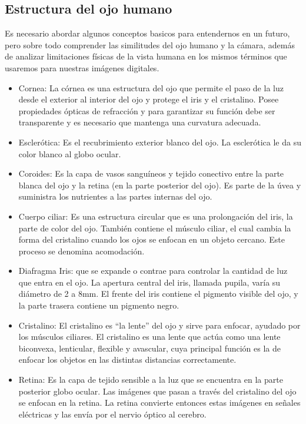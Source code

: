 \subsection{Estructura del ojo humano}
Es necesario abordar algunos conceptos basicos para entendernos en un 
futuro, pero sobre todo comprender las similitudes del ojo humano y 
la cámara, además de analizar limitaciones físicas de la vista humana 
en los mismos términos que usaremos para nuestras imágenes digitales.
\begin{itemize}
\item Cornea: La córnea es una estructura del ojo que permite el paso de la luz 
desde el exterior al interior del ojo y protege el iris y el cristalino. Posee 
propiedades ópticas de refracción y para garantizar su función debe ser transparente 
y es necesario que mantenga una curvatura adecuada.
\item Esclerótica: Es el recubrimiento exterior blanco del ojo. La esclerótica le da 
su color blanco al globo ocular.
\item Coroides: Es la capa de vasos sanguíneos y tejido conectivo entre la parte blanca del ojo y la retina (en la parte posterior del ojo). Es parte de la úvea y suministra los nutrientes a las partes internas del ojo.
\item Cuerpo ciliar: Es una estructura circular que es una prolongación del iris, la 
parte de color del ojo. También contiene el músculo ciliar, el cual cambia la forma 
del cristalino cuando los ojos se enfocan en un objeto cercano. Este proceso se 
denomina acomodación.
\item Diafragma Iris: que se expande o contrae para controlar la cantidad de luz que 
entra en el ojo. La apertura central del iris, llamada pupila, varía su diámetro de 2 
a 8mm. El frente del iris contiene el pigmento visible del ojo, y la parte trasera 
contiene un pigmento negro.
\item Cristalino: El cristalino es “la lente” del ojo y sirve para enfocar, ayudado 
por los músculos ciliares. El cristalino es una lente que actúa como una lente 
biconvexa, lenticular, flexible y avascular, cuya principal función es la de enfocar 
los objetos en las distintas distancias correctamente.
\item Retina: Es la capa de tejido sensible a la luz que se encuentra en la parte 
posterior globo ocular. Las imágenes que pasan a través del cristalino del ojo se 
enfocan en la retina. La retina convierte entonces estas imágenes en señales eléctricas
y las envía por el nervio óptico al cerebro.
\end{itemize}
